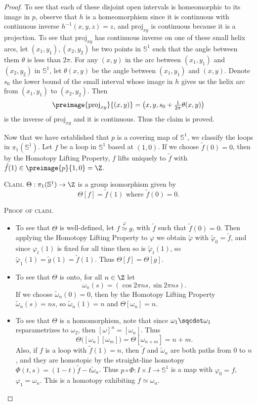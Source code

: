 \documentclass[12pt,letterpaper]{article}
\renewcommand{\phi}{\varphi}
\begin{document}
\begin{enumerate}
\begin{proof}
To see that each of these disjoint open intervals is homeomorphic to its image in $p$, observe that $h$ is a homeomorphism since it is continuous with continuous inverse $h^{-1}(x,y,z)=z$, and $\text{proj}_{xy}$ is continuous because it is a projection. To see that $\text{proj}_{xy}$ has continuous inverse on one of these small helix arcs, let $(x_1,y_1), (x_2,y_2)$ be two points in $\mathbb{S}^1$ such that the angle between them $\theta$ is less than $2\pi$. For any $(x,y)$ in the arc between $(x_1,y_1)$ and $(x_2,y_2)$ in $\mathbb S^1$, let $\theta(x,y)$ be the angle between $(x_1,y_1)$ and $(x,y)$. Denote $s_0$ the lower bound of the small interval whose image in $h$ gives us the helix arc from $(x_1,y_1)$ to $(x_2,y_2)$. Then
$$\preimage{\text{proj}_{xy}}{(x,y)}=\left(x,y,s_0+\tfrac{1}{2\pi} \theta(x,y)\right)$$
is the inverse of $\text{proj}_{xy}$ and it is continuous. Thus the claim is proved. \qedwhite

Now that we have established that $p$ is a covering map of $\mathbb{S}^1$, we classify the loops in $\pi_1(\mathbb{S}^1)$. 
Let $f$ be a loop in $\mathbb{S}^1$ based at $(1,0)$. If we choose $\tilde{f}(0)=0$, then by the Homotopy Lifting Property,  $f$ lifts uniquely to $\tilde{f}$ with $\tilde{f}(1)\in\preimage{p}{1,0}=\Z$. 

\textsc{Claim. } $\Theta:\pi_1(\mathbb{S}^1)\to\Z$ is a group isomorphism given by 
$$\Theta[f]=\tilde{f}(1) \text{ where } \tilde{f}(0)=0.$$

\textsc{Proof of claim. }
	\begin{itemize}
	\item To see that $\Theta$ is well-defined, let $f\overset{\phi}{\simeq} g$, with $\tilde{f}$ such that $\tilde{f}(0)=0$. Then applying the Homotopy Lifting Property to $\phi$ we obtain $\tilde{\phi}$ with $\tilde{\phi}_0=\tilde{f}$, and since $\phi_t(1)$ is fixed for all time then so is $\tilde{\phi}_t(1)$, so $\tilde{\phi}_1(1)=\tilde{g}(1)=\tilde{f}(1)$. Thus $\Theta[f]=\Theta[g]$. 
	
	\item To see that $\Theta$ is onto, for all $n\in \Z$ let 
	$$\omega_n(s)=(\cos 2\pi ns, \sin 2\pi ns).$$
	If we choose $\tilde{\omega}_n(0)=0$, then by the Homotopy Lifting Property $\tilde{\omega}_n(s)=ns$, so $\tilde{\omega}_n(1)=n$ and $\Theta[\omega_n]=n$. 
	
	\item To see that $\Theta$ is a homomorphism, note that since 
	$\omega_1\sqcdot\omega_1$ reparametrizes to $\omega_2$, then $[\omega]^n=[\omega_n]$. Thus 
	$$\Theta\big([\omega_n][\omega_m]\big)=\Theta[\omega_{n+m}]=n+m.$$
	Also, if $f$ is a loop with $\tilde{f}(1)=n$, then $\tilde{f}$ and $\tilde{\omega}_n$ are both paths from 0 to $n$, and they are homotopic by the straight-line homotopy $\Phi(t,s)=(1-t)\tilde{f}-t\tilde{\omega}_n$. Thus $p\circ\Phi:I\times I \to \mathbb{S}^1$ is a map with $\phi_0=f$, $\phi_1=\omega_n$. This is a homotopy exhibiting $f\simeq \omega_n$. 
	

\end{itemize}
\end{proof}
\end{enumerate}
\end{document}
